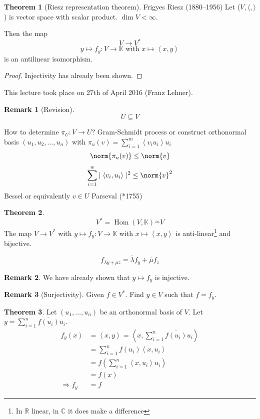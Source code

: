 \documentclass[a4paper,landscape,twocolumn]{article}
\newcommand\meta[3]{This #1 took place on #2 (#3).\par}
\newcommand\abs[1]{|\,#1\,|}
\newcommand\functional[1]{\left\langle{#1}\right\rangle}
\theoremstyle{definition}
\newtheorem{theorem}{Theorem}
\newtheorem{rem}{Remark}
\DeclareMathOperator\Hom{Hom} %
\DeclarePairedDelimiter\norm\lVert\rVert
\begin{document}
\begin{theorem}[Riesz representation theorem]
  Frigyes Riesz (1880--1956)
  Let ($V, \langle, \rangle$) is vector space with scalar product.
  $\dim{V} < \infty$.

  Then the map
  \[ V \to V^* \]
  \[ y \mapsto f_y: V \to \mathbb K \text{ with } x \mapsto \functional{x,y} \]
  is an antilinear isomorphism.
\end{theorem}
\begin{proof}
  Injectivity has already been shown.
\end{proof}

\meta{lecture}{27th of April 2016}{Franz Lehner}

\begin{rem}[Revision]
  \[ U \subseteq V \]

  How to determine $\pi_U: V \to U$? Gram-Schmidt process or construct orthonormal basis
  $(u_1, u_2, \ldots, u_n)$ with $\pi_u(v) = \sum_{i=1}^m \functional{v_i u_i} u_i$
  \[ \norm{\pi_u(v)} \leq \norm{v} \]
  \[ \sum_{i=1}^{w} \abs{\functional{v_i, u_i}}^2 \leq \norm{v}^2 \]
  Bessel or equivalently $v \in U$ Parseval (*1755)
\end{rem}

\begin{theorem}
  \[ V^* = \Hom(V, \mathbb K) \overset{\sim}{-} V \]
  The map $V \to V^*$ with $y \mapsto f_y: V \to \mathbb K$ with $x \mapsto \functional{x,y}$
  is anti-linear\footnote{In $\mathbb R$ linear, in $\mathbb C$ it does make a difference} and bijective.

  \[ f_{\lambda y + \mu z} = \overline{\lambda} f_y + \overline{\mu} f_z \]
\end{theorem}

\begin{rem}
  We have already shown that $y \mapsto f_y$ is injective.
\end{rem}
\begin{rem}[Surjectivity]
  Given $f \in V^*$. Find $y \in V$ such that $f = f_y$.
\end{rem}

\begin{theorem}
  Let $(u_1, \ldots, u_n)$ be an orthonormal basis of $V$.
  Let $y = \sum_{i=1}^n \overline{f(u_i)} u_i$.
  \begin{align*}
    f_y(x) &= \functional{x,y} = \functional{x, \sum_{i=1}^n \overline{f(u_i)} u_i} \\
      &= \sum_{i=1}^n f(u_i) \functional{x,u_i} \\
      &= f\left(\sum_{i=1}^n \functional{x,u_i} u_i\right) \\
      &= f(x) \\
    \Rightarrow f_y &= f
  \end{align*}
\end{theorem}
\end{document}
